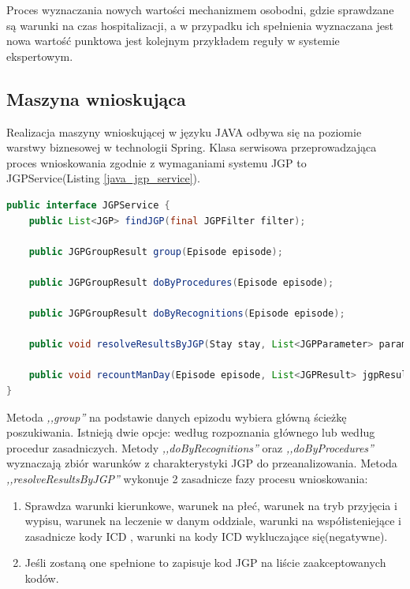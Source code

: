 Proces wyznaczania nowych wartości mechanizmem osobodni, gdzie sprawdzane są warunki na czas hospitalizacji, a w przypadku ich spełnienia wyznaczana jest nowa wartość punktowa jest kolejnym przykładem reguły w systemie ekspertowym.

\subsection{Maszyna wnioskująca}
\label{sec:maszynaWnioskujaca}
Realizacja maszyny wnioskującej w języku JAVA odbywa się na poziomie warstwy biznesowej w technologii Spring. Klasa serwisowa przeprowadzająca proces wnioskowania zgodnie z wymaganiami systemu JGP to JGPService(Listing \ref{java_jgp_service}).

\begin{lstlisting}[language=Java,caption={Serwis JGP - realizacja maszyny wnioskującej.},label=java_jgp_service]
public interface JGPService {
    public List<JGP> findJGP(final JGPFilter filter);

    public JGPGroupResult group(Episode episode);

    public JGPGroupResult doByProcedures(Episode episode);

    public JGPGroupResult doByRecognitions(Episode episode);

    public void resolveResultsByJGP(Stay stay, List<JGPParameter> parameters, JGPGroupResult jgpGroupResult);

    public void recountManDay(Episode episode, List<JGPResult> jgpResultList);
}
\end{lstlisting}

Metoda \textit{,,group''} na podstawie danych epizodu wybiera główną ścieżkę poszukiwania. Istnieją dwie opcje: według rozpoznania głównego lub według procedur zasadniczych. Metody \textit{,,doByRecognitions''} oraz \textit{,,doByProcedures''} wyznaczają zbiór warunków z charakterystyki JGP do przeanalizowania. Metoda \textit{,,resolveResultsByJGP''} wykonuje 2 zasadnicze fazy procesu wnioskowania:
\begin{enumerate}\itemsep1pt
 \item Sprawdza warunki kierunkowe, warunek na płeć, warunek na tryb przyjęcia i wypisu, warunek na leczenie w danym oddziale, warunki na współisteniejące i zasadnicze kody ICD , warunki na kody ICD wykluczające się(negatywne).
 \item Jeśli zostaną one spełnione to zapisuje kod JGP na liście zaakceptowanych kodów.
\end{enumerate}

